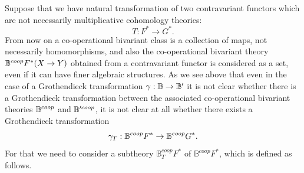 \documentclass[a4paper]{amsart}
\begin{document}
Suppose that we have natural transformation of two contravariant functors which are not necessarily multiplicative cohomology theories:
$$T:F^* \to G^*.$$
From now on a co-operational bivariant class is a collection of maps, not necessarily homomorphisms, and also the co-operational bivariant theory $\mathbb B^{coop}F^*(X \to Y)$ obtained from a contravariant functor is considered as a set, even if it can have finer algebraic structures.
As we see above that even in the case of a Grothendieck transformation $\gamma: \mathbb B \to \mathbb B'$ it is not clear whether there is a Grothendieck transformation between the associated co-operational bivariant theories $\mathbb B^{coop}$ and $\mathbb B'^{coop}$, it is not clear at all whether there exists a Grothendieck transformation
$$\gamma_T: \mathbb B^{coop} F^* \to  \mathbb B^{coop} G^* .$$
For that we need to 
consider a subtheory $ \mathbb B^{coop}_T F^*$ of $\mathbb B^{coop} F^*$, which is defined
as follows.
\end{document}
